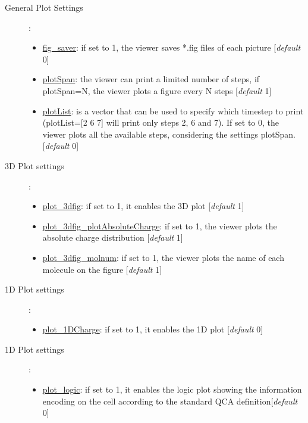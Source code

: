 \documentclass[a4paper,10pt]{article}
\begin{document}
\begin{description}
\item[General Plot Settings]:
\begin{itemize}
	\item \underline{fig\_saver}: if set to 1, the viewer saves *.fig files of each picture [\textit{default} 0]
	\item \underline{plotSpan}: the viewer can print a limited number of steps, if plotSpan=N, the viewer plots a figure every N steps [\textit{default} 1]
		\item \underline{plotList}: is a vector that can be used to specify which timestep to print (plotList=[2 6 7] will print only steps 2, 6 and 7). If set to 0, the viewer plots all the available steps, considering the settings plotSpan. [\textit{default} 0]
\end{itemize}
\item[3D Plot settings]:
\begin{itemize}
	\item \underline{plot\_3dfig}: if set to 1, it enables the 3D plot [\textit{default} 1]
	\item \underline{plot\_3dfig\_plotAbsoluteCharge}: if set to 1, the viewer plots the absolute charge distribution [\textit{default} 1]
	\item \underline{plot\_3dfig\_molnum}: if set to 1, the viewer plots the name of each molecule on the figure [\textit{default} 1]
\end{itemize}
\item[1D Plot settings]:
\begin{itemize}
	\item \underline{plot\_1DCharge}: if set to 1, it enables the 1D plot [\textit{default} 0]
\end{itemize}

\item[1D Plot settings]:
\begin{itemize}
	\item \underline{plot\_logic}: if set to 1, it enables the logic plot showing the information encoding on the cell according to the standard QCA definition[\textit{default} 0]
\end{itemize}


\end{description}
\end{document}
